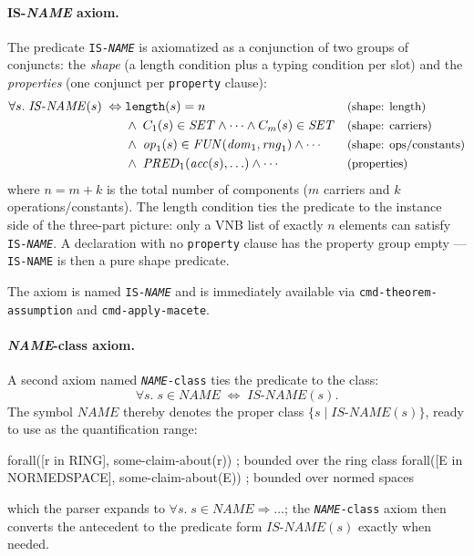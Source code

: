\paragraph{IS-\textit{NAME} axiom.}
The predicate \texttt{IS-\textit{NAME}} is axiomatized as a conjunction
of two groups of conjuncts: the \emph{shape} (a length condition plus a
typing condition per slot) and the \emph{properties} (one conjunct per
\texttt{property} clause):
\begin{align*}
  \forall s.\;\mathit{IS\text{-}NAME}(s) \;\Leftrightarrow\; &
  \mathtt{length}(s) = n
  && \text{\small(shape: length)}\\
  &\land\; C_1(s) \in \mathit{SET} \land \cdots \land C_m(s) \in \mathit{SET}
  && \text{\small(shape: carriers)}\\
  &\land\; \mathit{op}_1(s) \in \mathit{FUN}(\mathit{dom}_1, \mathit{rng}_1)
  \land \cdots
  && \text{\small(shape: ops/constants)}\\
  &\land\; \mathit{PRED}_1(\mathit{acc}(s), \ldots) \land \cdots
  && \text{\small(properties)}
\end{align*}
where $n = m + k$ is the total number of components ($m$ carriers and $k$
operations/constants).  The length condition ties the predicate to the
instance side of the three-part picture: only a VNB list of exactly $n$
elements can satisfy \texttt{IS-\textit{NAME}}.  A declaration with no
\texttt{property} clause has the property group empty --- \texttt{IS-NAME}
is then a pure shape predicate.

\begin{sloppypar}The axiom is named \texttt{IS-\textit{NAME}} and is immediately available
via \texttt{cmd-theorem-assumption} and \texttt{cmd-apply-macete}.\end{sloppypar}

\paragraph{\textit{NAME}-class axiom.}
A second axiom named \texttt{\textit{NAME}-class} ties the predicate to
the class:
\[
  \forall s.\; s \in \mathit{NAME} \;\Leftrightarrow\; \mathit{IS\text{-}NAME}(s).
\]
The symbol $\mathit{NAME}$ thereby denotes the proper class
$\{s \mid \mathit{IS\text{-}NAME}(s)\}$, ready to use as the
quantification range:
\begin{VNBsnip}
forall([r in RING],        some-claim-about(r))   ; bounded over the ring class
forall([E in NORMEDSPACE], some-claim-about(E))   ; bounded over normed spaces
\end{VNBsnip}
which the parser expands to
$\forall s.\; s \in \mathit{NAME} \Rightarrow \ldots$; the
\texttt{\textit{NAME}-class} axiom then converts the antecedent to
the predicate form $\mathit{IS\text{-}NAME}(s)$ exactly when needed.

